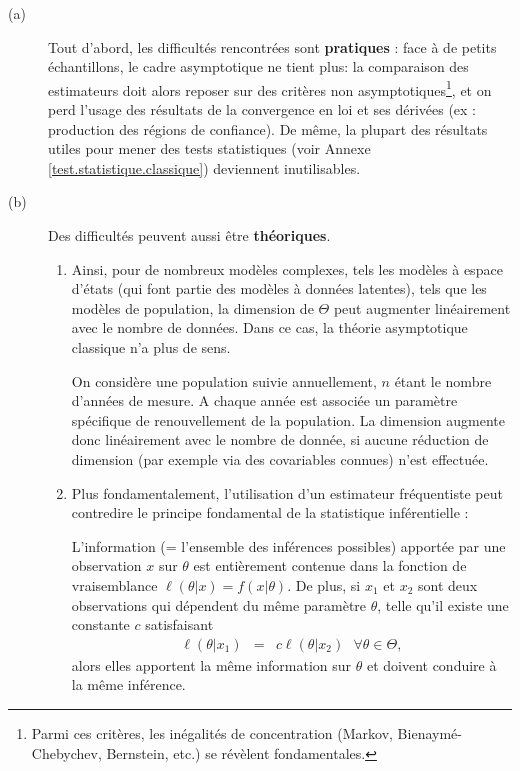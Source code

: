\begin{description}
    \item[(a)] Tout d'abord, les difficultés rencontrées sont {\bf pratiques} : face à de petits échantillons, le cadre asymptotique ne tient plus: la comparaison des estimateurs doit alors reposer sur des critères non asymptotiques\footnote{Parmi ces critères, les inégalités de concentration (Markov, Bienaymé-Chebychev, Bernstein, etc.) se révèlent fondamentales.}, et on perd l'usage des résultats de la convergence en loi et ses dérivées (ex : production des régions de confiance). De même, la plupart des résultats utiles pour mener des tests statistiques (voir Annexe \ref{test.statistique.classique}) deviennent inutilisables.
    \item[(b)] Des difficultés peuvent aussi être {\bf théoriques}. 
    \begin{enumerate}
        \item Ainsi, pour de nombreux modèles complexes, tels les modèles à espace d'états (qui font partie des modèles à données latentes), tels que les modèles de population, la dimension de $\Theta$ peut augmenter linéairement avec le nombre de données. Dans ce cas, la théorie asymptotique classique n'a plus de sens. \\
        
        \begin{exo}
            On considère une population suivie annuellement, $n$ étant le nombre d'années de mesure. A chaque année est associée un paramètre spécifique de renouvellement de la population. La dimension augmente donc linéairement avec le nombre de donnée, si aucune réduction de dimension (par exemple via des covariables connues) n'est effectuée. \\
        \end{exo}
        
        \item Plus fondamentalement, l'utilisation d'un estimateur fréquentiste peut contredire le principe fondamental de la statistique inférentielle :
        
        \begin{definition}
        L'information {\footnotesize (= l'ensemble des inférences possibles)} apportée par une observation $x$ sur $\theta$ est entièrement contenue dans la fonction de vraisemblance $\ell(\theta|x)=f(x|\theta)$. De plus, si $x_1$ et $x_2$ sont deux observations qui dépendent du m\^eme paramètre $\theta$, telle qu'il existe une constante $c$ satisfaisant 
\begin{eqnarray*}
\ell(\theta|x_1) & = & c\ell(\theta|x_2) \ \ \ \forall \theta\in\Theta,
\end{eqnarray*}
alors elles apportent la m\^eme information sur $\theta$ et doivent conduire à la m\^eme inférence. \\
        \end{definition}
        

\end{enumerate}
\end{description}
